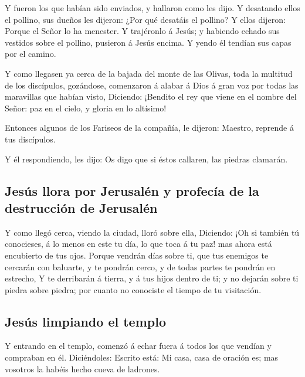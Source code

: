  Y fueron los que habían sido enviados, y hallaron como
les dijo.  Y desatando ellos el pollino, sus dueños les
dijeron: ¿Por qué desatáis el pollino?  Y ellos dijeron:
Porque el Señor lo ha menester.  Y trajéronlo á Jesús; y
habiendo echado sus vestidos sobre el pollino, pusieron á Jesús encima.
 Y yendo él tendían sus capas por el camino.

 Y como llegasen ya cerca de la bajada del monte de las
Olivas, toda la multitud de los discípulos, gozándose, comenzaron á
alabar á Dios á gran voz por todas las maravillas que habían visto,
 Diciendo: ¡Bendito el rey que viene en el nombre del
Señor: paz en el cielo, y gloria en lo altísimo!

 Entonces algunos de los Fariseos de la compañía, le
dijeron: Maestro, reprende á tus discípulos.

 Y él respondiendo, les dijo: Os digo que si éstos
callaren, las piedras clamarán.

\hypertarget{jesuxfas-llora-por-jerusaluxe9n-y-profecuxeda-de-la-destrucciuxf3n-de-jerusaluxe9n}{%
\subsection{Jesús llora por Jerusalén y profecía de la destrucción de
Jerusalén}\label{jesuxfas-llora-por-jerusaluxe9n-y-profecuxeda-de-la-destrucciuxf3n-de-jerusaluxe9n}}

 Y como llegó cerca, viendo la ciudad, lloró sobre ella,
 Diciendo: ¡Oh si también tú conocieses, á lo menos en
este tu día, lo que toca á tu paz! mas ahora está encubierto de tus
ojos.  Porque vendrán días sobre ti, que tus enemigos te
cercarán con baluarte, y te pondrán cerco, y de todas partes te pondrán
en estrecho,  Y te derribarán á tierra, y á tus hijos
dentro de ti; y no dejarán sobre ti piedra sobre piedra; por cuanto no
conociste el tiempo de tu visitación.

\hypertarget{jesuxfas-limpiando-el-templo}{%
\subsection{Jesús limpiando el
templo}\label{jesuxfas-limpiando-el-templo}}

 Y entrando en el templo, comenzó á echar fuera á todos
los que vendían y compraban en él.  Diciéndoles: Escrito
está: Mi casa, casa de oración es; mas vosotros la habéis hecho cueva de
ladrones.

